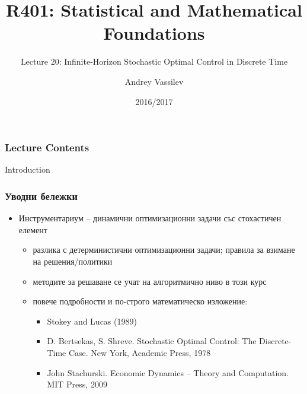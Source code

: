 \documentclass[10pt]{beamer}
\title{R401: Statistical and Mathematical Foundations}
\subtitle{Lecture 20: Infinite-Horizon Stochastic Optimal Control in Discrete Time}
\author{Andrey Vassilev}
\date{2016/2017}
\theoremstyle{definition}
\begin{document}
\maketitle



\begin{frame}[fragile]
\frametitle{Lecture Contents}
\tableofcontents
\end{frame}

\begin{section}{Introduction}\label{sec:intro}

\begin{frame}
\frametitle{Уводни бележки}
\begin{itemize}
\item Инструментариум -- динамични оптимизационни задачи със стохастичен елемент
\begin{itemize}
  \item разлика с детерминистични оптимизационни задачи; правила за взимане на решения/политики
  \item методите за решаване се учат на алгоритмично ниво в този курс
  \item повече подробности и по-строго математическо изложение:
  \begin{itemize}
    \item Stokey and Lucas (1989)
    \item D. Bertsekas, S. Shreve. Stochastic Optimal Control: The Discrete-Time Case. New
York, Academic Press, 1978
    \item John Stachurski. Economic Dynamics --  Theory and Computation. MIT Press, 2009
  \end{itemize}
\end{itemize}
\end{itemize}
\end{frame}




\end{section}
\end{document}
